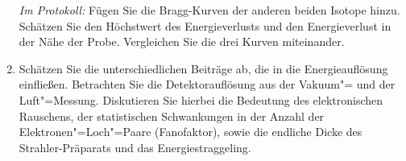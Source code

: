 \begin{enumerate}[label=\textbf{\alph*)}]
	\textit{Im Protokoll:} Fügen Sie die Bragg-Kurven der anderen beiden Isotope hinzu. Schätzen Sie den Höchstwert des Energieverlusts und den Energieverlust in der Nähe der Probe. Vergleichen Sie die drei Kurven miteinander.
	\item Schätzen Sie die unterschiedlichen Beiträge ab, die in die Energieauflösung einfließen. Betrachten Sie die Detektorauflösung aus der Vakuum"= und der Luft"=Messung. Diskutieren Sie hierbei die Bedeutung des elektronischen Rauschens, der statistischen Schwankungen in der Anzahl der Elektronen"=Loch"=Paare (Fanofaktor), sowie die endliche Dicke des Strahler-Präparats und das Energiestraggeling.
\end{enumerate}
%
%





